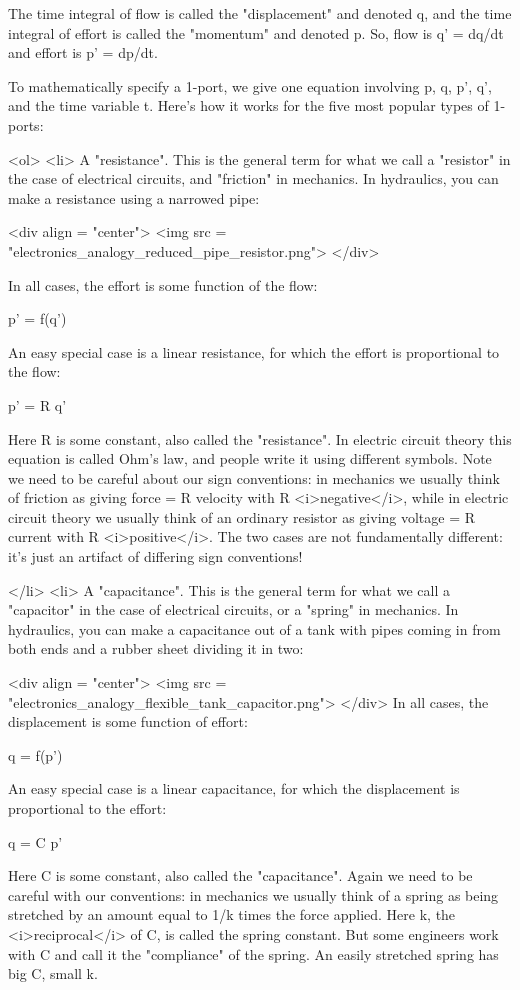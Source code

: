 The time integral of flow is called the "displacement" and
denoted q, and the time integral of effort is called the
"momentum" and denoted p.  So, flow is q' = dq/dt and effort
is p' = dp/dt.

To mathematically specify a 1-port, we give one equation involving p,
q, p', q', and the time variable t.  Here's how it works for the five
most popular types of 1-ports:

<ol>
<li> 
  A "resistance".  This is the general term for what we
  call a "resistor" in the case of electrical circuits, and
  "friction" in mechanics.  In hydraulics, you can make
  a resistance using a narrowed pipe:

<div align = "center">
<img src = "electronics_analogy_reduced_pipe_resistor.png">
</div>

In all cases, the effort is some function of the flow:

  p' = f(q')

  An easy special case is a linear resistance, for which the effort
  is proportional to the flow:

  p' = R q'

  Here R is some constant, also called the "resistance".  In
  electric circuit theory this equation is called Ohm's law, and
  people write it using different symbols.  Note we need to be careful
  about our sign conventions: in mechanics we usually think of
  friction as giving force = R velocity with R <i>negative</i>, while
  in electric circuit theory we usually think of an ordinary resistor
  as giving voltage = R current with R <i>positive</i>.  The two cases
  are not fundamentally different: it's just an artifact of differing
  sign conventions!

</li>
<li> A "capacitance".  This is the general term for what we
  call a "capacitor" in the case of electrical circuits, or
  a "spring" in mechanics.  In hydraulics, you can make a
  capacitance out of a tank with pipes coming in from both ends and a
  rubber sheet dividing it in two:

<div align = "center">
<img src = "electronics_analogy_flexible_tank_capacitor.png">
</div>
  In all cases, the displacement is some
  function of effort:

  q = f(p')

  An easy special case is a linear capacitance, for which the 
  displacement is proportional to the effort:

  q = C p'

  Here C is some constant, also called the "capacitance".
  Again we need to be careful with our conventions: in mechanics we
  usually think of a spring as being stretched by an amount equal to
  1/k times the force applied.  Here k, the <i>reciprocal</i> of C, is
  called the spring constant.  But some engineers work with C and call
  it the "compliance" of the spring.  An easily stretched
  spring has big C, small k.

